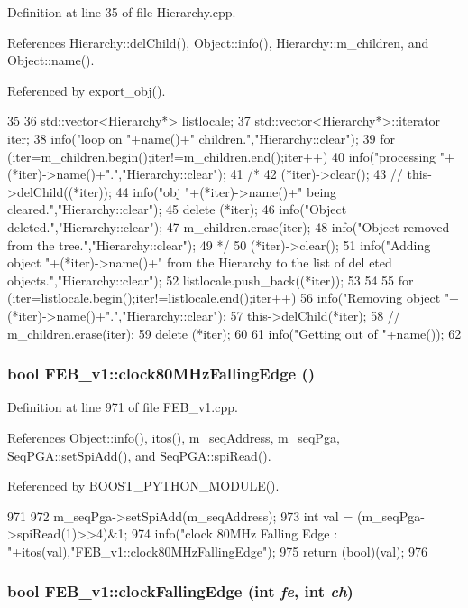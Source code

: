 Definition at line 35 of file Hierarchy.cpp.

References Hierarchy::delChild(), Object::info(), Hierarchy::m\_\-children, and Object::name().

Referenced by export\_\-obj().


\begin{DoxyCode}
35                      {
36   std::vector<Hierarchy*> listlocale;
37   std::vector<Hierarchy*>::iterator iter;
38   info("loop on "+name()+" children.","Hierarchy::clear");
39   for (iter=m_children.begin();iter!=m_children.end();iter++){
40       info("processing "+(*iter)->name()+".","Hierarchy::clear");
41 /*
42       (*iter)->clear();
43 //      this->delChild((*iter));
44       info("obj "+(*iter)->name()+" being cleared.","Hierarchy::clear");
45       delete (*iter);
46       info("Object deleted.","Hierarchy::clear");
47       m_children.erase(iter);
48       info("Object removed from the tree.","Hierarchy::clear");
49 */
50     (*iter)->clear();
51     info("Adding object "+(*iter)->name()+" from the Hierarchy to the list of del
      eted objects.","Hierarchy::clear");
52     listlocale.push_back((*iter));
53   }
54 
55   for (iter=listlocale.begin();iter!=listlocale.end();iter++){
56     info("Removing object "+(*iter)->name()+".","Hierarchy::clear");
57     this->delChild(*iter);
58 //    m_children.erase(iter);
59     delete (*iter);
60   }
61   info("Getting out of "+name());
62 }
\end{DoxyCode}
\hypertarget{classFEB__v1_a8518757e40b372f784674da1a2c41091}{
\subsubsection[{clock80MHzFallingEdge}]{\setlength{\rightskip}{0pt plus 5cm}bool FEB\_\-v1::clock80MHzFallingEdge ()}}
\label{classFEB__v1_a8518757e40b372f784674da1a2c41091}


Definition at line 971 of file FEB\_\-v1.cpp.

References Object::info(), itos(), m\_\-seqAddress, m\_\-seqPga, SeqPGA::setSpiAdd(), and SeqPGA::spiRead().

Referenced by BOOST\_\-PYTHON\_\-MODULE().


\begin{DoxyCode}
971                                   {
972   m_seqPga->setSpiAdd(m_seqAddress);
973   int val = (m_seqPga->spiRead(1)>>4)&1;
974   info("clock 80MHz Falling Edge : "+itos(val),"FEB_v1::clock80MHzFallingEdge");
975   return (bool)(val);
976 }
\end{DoxyCode}
\hypertarget{classFEB__v1_aa9f591714dce594562e3e959b105a580}{
\subsubsection[{clockFallingEdge}]{\setlength{\rightskip}{0pt plus 5cm}bool FEB\_\-v1::clockFallingEdge (int {\em fe}, \/  int {\em ch})}}
\label{classFEB__v1_aa9f591714dce594562e3e959b105a580}



